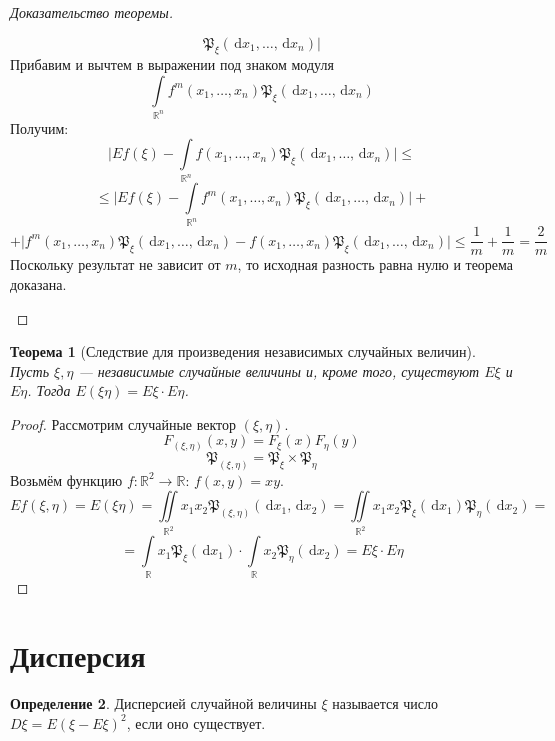 \documentclass[11pt,openany,a4paper]{scrartcl}
\theoremstyle{plain}
\newtheorem{theorem}{Теорема}[section]
\theoremstyle{definition}
\newtheorem{definition}[theorem]{Определение}
\newcommand\mb{\mathbb}
\newcommand\real{\mb R}
\newcommand{\dif}{\, \mathrm d}
\begin{document}
\begin{proof}[Доказательство теоремы]
\begin{enumerate}
$$        \mathfrak P_\xi(\dif x_1, \ldots, \dif x_n)\big|
        $$
        Прибавим и вычтем в выражении под знаком модуля
        $$
        \int\limits_{\real^n} f^m(x_1, \ldots, x_n)
        \mathfrak P_\xi(\dif x_1, \ldots, \dif x_n)
        $$
        Получим:
        $$
        \big| Ef(\xi) - \int\limits_{\real^n} f(x_1, \ldots, x_n)
        \mathfrak P_\xi(\dif x_1, \ldots, \dif x_n)\big| \leqslant
        $$
        $$
        \leqslant\big| Ef(\xi) - \int\limits_{\real^n} f^m(x_1, \ldots, x_n)
        \mathfrak P_\xi(\dif x_1, \ldots, \dif x_n)\big| +
        $$
        $$
        +\big|f^m(x_1, \ldots, x_n)
        \mathfrak P_\xi(\dif x_1, \ldots, \dif x_n) -
        f(x_1, \ldots, x_n)
        \mathfrak P_\xi(\dif x_1, \ldots, \dif x_n)\big| \leqslant
        \frac{1}{m} + \frac{1}{m} = \frac{2}{m}
        $$
        Поскольку результат не зависит от $m$, то исходная разность равна нулю
        и теорема доказана.
    \end{enumerate}
\end{proof}

\begin{theorem}[Следствие для произведения независимых случайных величин]
    Пусть $\xi, \eta$ — независимые случайные величины и, кроме того,
    существуют $E\xi$ и $E\eta$. Тогда $E(\xi\eta) = E\xi \cdot E\eta$.
\end{theorem}
\begin{proof}
    Рассмотрим случайные вектор $(\xi, \eta)$.
    $$
    F_{(\xi, \eta)}(x, y) = F_\xi(x)F_\eta(y)
    $$
    $$
    \mathfrak P_{(\xi, \eta)} = \mathfrak P_\xi \times \mathfrak P_\eta
    $$
    Возьмём функцию $f: \real^2 \to \real$: $f(x, y) = xy$.
    $$
    Ef(\xi, \eta) = E(\xi\eta) = \iint\limits_{\real^2} x_1x_2
    \mathfrak P_{(\xi, \eta)}(\dif x_1, \dif x_2) =
    \iint\limits_{\real^2} x_1x_2 \mathfrak P_\xi(\dif x_1)
    \mathfrak P_\eta(\dif x_2) =
    $$
    $$
    = \int\limits_{\real} x_1\mathfrak P_\xi(\dif x_1) \cdot
    \int\limits_{\real} x_2\mathfrak P_\eta(\dif x_2) =
    E\xi \cdot E\eta
    $$
\end{proof}

\section{Дисперсия}

\begin{definition}
    Дисперсией случайной величины $\xi$ называется число
    $D\xi = E(\xi - E\xi)^2$, если оно существует.
\end{definition}
\end{document}
